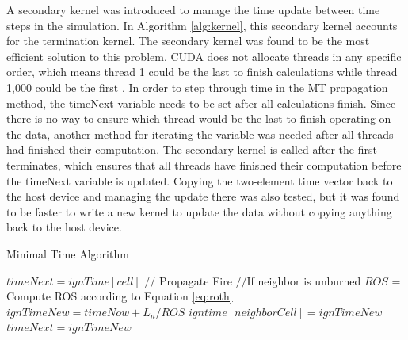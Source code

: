 A secondary kernel was introduced to manage the time update between time steps in the simulation. In Algorithm \ref{alg:kernel}, this secondary kernel accounts for the termination kernel. The secondary kernel was found to be the most efficient solution to this problem. CUDA does not allocate threads in any specific order, which means thread 1 could be the last to finish calculations while thread 1,000 could be the first \cite{cudabyexample}. In order to step through time in the MT propagation method, the timeNext variable needs to be set after all calculations finish. Since there is no way to ensure which thread would be the last to finish operating on the data, another method for iterating the variable was needed after all threads had finished their computation. The secondary kernel is called after the first terminates, which ensures that all threads have finished their computation before the timeNext variable is updated. Copying the two-element time vector back to the host device and managing the update there was also tested, but it was found to be faster to write a new kernel to update the data without copying anything back to the host device.

\begin{algorithm}[H]
  \caption{Minimal Time Algorithm}
  \label{alg:MT}
  \begin{algorithmic}
  \STATE $timeNext = ignTime[cell]$
  \STATE $//$ Propagate Fire
  \STATE $//$If neighbor is unburned
  \STATE $ROS$ = Compute ROS according to Equation \ref{eq:roth}
  \STATE $ignTimeNew = timeNow + L_n / ROS$
  \STATE $igntime[neighborCell] = ignTimeNew$
  \ENDIF
  \STATE $timeNext = ignTimeNew$
  \ENDIF
  \ENDIF
  \ENDFOR
  \ENDIF
  \ENDFOR
  \end{algorithmic}
\end{algorithm}

